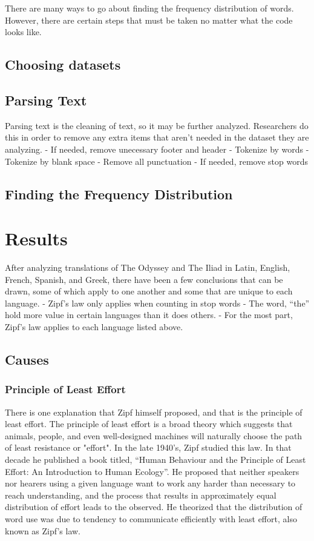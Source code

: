 \documentclass[a4paper,10pt]{article}
\newcounter{code}[section]
\begin{document}
There are many ways to go about finding the frequency distribution of words. However, there are certain steps that must be taken no matter what the code looks like.  

\subsection{Choosing datasets}


\subsection{Parsing Text}

Parsing text is the cleaning of text, so it may be further analyzed. Researchers do this in order to remove any extra items that aren’t needed in the dataset they are analyzing.  
-  If needed, remove unecessary footer and header
- Tokenize by words
- Tokenize by blank space
- Remove all punctuation
- If needed, remove stop words

\subsection{Finding the Frequency Distribution}

\section{Results}

After analyzing translations of The Odyssey and The Iliad in Latin, English, French, Spanish, and Greek, there have been a few conclusions that can be drawn, some of which apply to one another and some that are unique to each language. 
- Zipf’s law only applies when counting in stop words
- The word, “the” hold more value in certain languages than it does others.
- For the most part, Zipf’s law applies to each language listed above.



\subsection{Causes}

\subsubsection{Principle of Least Effort}

There is one explanation that Zipf himself proposed, and that is the principle of least effort. The principle of least effort is a broad theory which suggests that animals, people, and even well-designed machines will naturally choose the path of least resistance or "effort". In the late 1940’s, Zipf studied this law. In that decade he published a book titled, “Human Behaviour and the Principle of Least Effort: An Introduction to Human Ecology”. He proposed that neither speakers nor hearers using a given language want to work any harder than necessary to reach understanding, and the process that results in approximately equal distribution of effort leads to the observed. He theorized that the distribution of word use was due to tendency to communicate efficiently with least effort, also known as Zipf’s law. 
\end{document}
